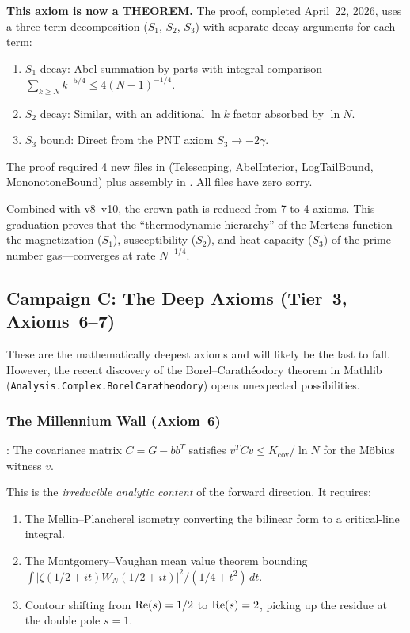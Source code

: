 \documentclass[11pt,a4paper]{article}
\begin{document}
\textbf{This axiom is now a THEOREM.} The proof, completed April~22, 2026,
uses a three-term decomposition ($S_1$, $S_2$, $S_3$) with separate
decay arguments for each term:
\begin{enumerate}
  \item $S_1$ decay: Abel summation by parts with integral comparison
    $\sum_{k \geq N} k^{-5/4} \le 4(N-1)^{-1/4}$.
  \item $S_2$ decay: Similar, with an additional $\ln k$ factor absorbed
    by $\ln N$.
  \item $S_3$ bound: Direct from the PNT axiom $S_3 \to -2\gamma$.
\end{enumerate}
The proof required 4 new files in  (Telescoping, AbelInterior,
LogTailBound, MononotoneBound) plus assembly in .
All files have zero sorry.

Combined with v8--v10, the crown path is reduced from 7 to 4 axioms. This graduation proves
that the ``thermodynamic hierarchy'' of the Mertens function---the
magnetization ($S_1$), susceptibility ($S_2$), and heat capacity ($S_3$)
of the prime number gas---converges at rate $N^{-1/4}$.

\subsection{Campaign C: The Deep Axioms (Tier~3, Axioms~6--7)}

These are the mathematically deepest axioms and will likely be the last
to fall. However, the recent discovery of the Borel--Carath\'eodory
theorem in Mathlib (\texttt{Analysis.Complex.BorelCaratheodory}) opens
unexpected possibilities.

\subsubsection{The Millennium Wall (Axiom~6)}

\begin{axiombox}
: The covariance matrix
$C = G - bb^T$ satisfies $v^T C v \le K_{\mathrm{cov}}/\ln N$ for the
M\"obius witness $v$.
\end{axiombox}

This is the \emph{irreducible analytic content} of the forward direction.
It requires:
\begin{enumerate}
  \item The Mellin--Plancherel isometry converting the bilinear form
    to a critical-line integral.
  \item The Montgomery--Vaughan mean value theorem bounding
    $\int |\zeta(1/2+it) W_N(1/2+it)|^2 / (1/4+t^2)\,dt$.
  \item Contour shifting from $\operatorname{Re}(s) = 1/2$ to $\operatorname{Re}(s) = 2$,
    picking up the residue at the double pole $s = 1$.
\end{enumerate}
\end{document}
